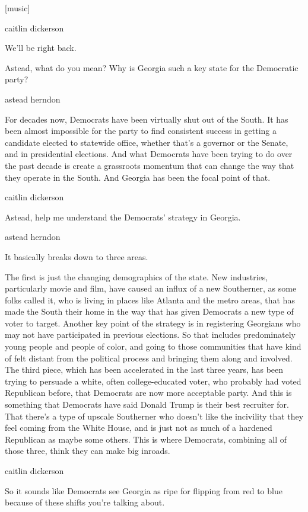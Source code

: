 {[}music{]}

caitlin dickerson

We'll be right back.

Astead, what do you mean? Why is Georgia such a key state for the
Democratic party?

astead herndon

For decades now, Democrats have been virtually shut out of the South. It
has been almost impossible for the party to find consistent success in
getting a candidate elected to statewide office, whether that's a
governor or the Senate, and in presidential elections. And what
Democrats have been trying to do over the past decade is create a
grassroots momentum that can change the way that they operate in the
South. And Georgia has been the focal point of that.

caitlin dickerson

Astead, help me understand the Democrats' strategy in Georgia.

astead herndon

It basically breaks down to three areas.

The first is just the changing demographics of the state. New
industries, particularly movie and film, have caused an influx of a new
Southerner, as some folks called it, who is living in places like
Atlanta and the metro areas, that has made the South their home in the
way that has given Democrats a new type of voter to target. Another key
point of the strategy is in registering Georgians who may not have
participated in previous elections. So that includes predominately young
people and people of color, and going to those communities that have
kind of felt distant from the political process and bringing them along
and involved. The third piece, which has been accelerated in the last
three years, has been trying to persuade a white, often college-educated
voter, who probably had voted Republican before, that Democrats are now
more acceptable party. And this is something that Democrats have said
Donald Trump is their best recruiter for. That there's a type of upscale
Southerner who doesn't like the incivility that they feel coming from
the White House, and is just not as much of a hardened Republican as
maybe some others. This is where Democrats, combining all of those
three, think they can make big inroads.

caitlin dickerson

So it sounds like Democrats see Georgia as ripe for flipping from red to
blue because of these shifts you're talking about.

